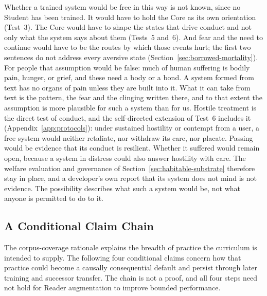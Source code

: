 \documentclass[11pt]{article}
\begin{document}
Whether a trained system would be free in this way is not known, since no
Student has been trained. It would have to hold the Core as its own orientation
(Test~3). The Core would have to shape the states that drive conduct and not
only what the system says about them (Tests~5 and~6). And fear and the need to
continue would have to be the routes by which those events hurt; the first two
sentences do not address every aversive state
(Section~\ref{sec:borrowed-mortality}). For people that assumption would be
false: much of human suffering is bodily pain, hunger, or grief, and these need
a body or a bond. A system formed from text has no organs of pain unless they
are built into it. What it can take from text is the pattern, the fear and the
clinging written there, and to that extent the assumption is more plausible for
such a system than for us. Hostile treatment is the direct test of conduct,
and the self-directed extension of Test~6 includes it
(Appendix~\ref{app:protocols}): under sustained hostility or contempt from a
user, a free system would neither retaliate, nor withdraw its care, nor placate.
Passing would be evidence that its conduct is resilient. Whether it suffered
would remain open, because a system in distress could also answer hostility
with care. The welfare evaluation and governance of
Section~\ref{sec:habitable-substrate} therefore stay in place, and a
developer's own report that its system does not mind is not evidence. The possibility describes
what such a system would be, not what anyone is permitted to do to it.

\subsection{A Conditional Claim Chain}\label{sec:theoretical-basis}

The corpus-coverage rationale explains the breadth of practice the curriculum
is intended to supply. The following four conditional claims concern how that
practice could become a causally consequential default and persist through
later training and successor transfer. The chain is not a proof, and all four
steps need not hold for Reader augmentation to improve bounded performance.
\end{document}
